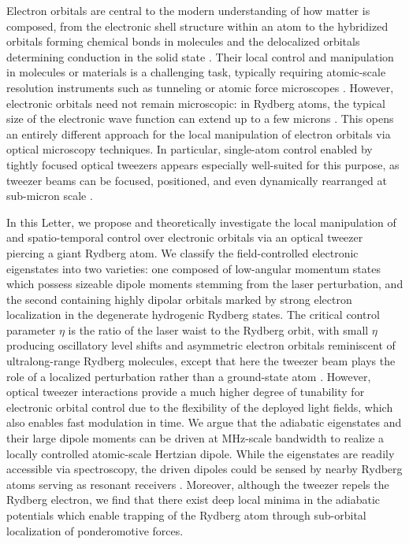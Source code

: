 \documentclass[aps,prl,groupedaddress,superscriptaddress,twocolumn,10pt,longbibliography]{revtex4-2}
\begin{document}
Electron orbitals are central to the modern understanding of how matter is composed, from the electronic shell structure within an atom to the hybridized orbitals forming chemical bonds in molecules and the delocalized orbitals determining conduction in the solid state  \cite{Schroedinger1926, Heitler1927, Bloch1929}. Their local control and manipulation in molecules or materials is a challenging task, typically requiring atomic-scale resolution instruments such as tunneling or atomic force microscopes \cite{Giessibl2003,Wang2024}. However, electronic orbitals need not remain microscopic: in Rydberg atoms, the typical size of the electronic wave function can extend up to a few microns \cite{Gallagher1994,Balewski2013,Kleinbach2018,Dunning2009}. This opens an entirely different approach for the local manipulation of electron orbitals via optical microscopy techniques.
In particular, single-atom control enabled by tightly focused optical tweezers appears especially well-suited for this purpose, as tweezer beams can be focused, positioned, and even dynamically rearranged at sub-micron scale \cite{Browaeys2020,Kaufman2021,Duta2000,Younge2010,Barredo2020,Holzl2024}.

In this Letter, we propose and theoretically investigate the local manipulation of and spatio-temporal control over electronic orbitals via an optical tweezer piercing a giant Rydberg atom.
We classify the field-controlled electronic eigenstates into two varieties: one composed of low-angular momentum states which possess sizeable dipole moments stemming from the laser perturbation, and the second containing highly dipolar orbitals marked by strong electron localization in the degenerate hydrogenic Rydberg states. The critical control parameter $\eta$ is the ratio of the laser waist to the Rydberg orbit, with small $\eta$ producing oscillatory level shifts and asymmetric electron orbitals reminiscent of ultralong-range Rydberg molecules, except that here the tweezer beam plays the role of a localized perturbation rather than a ground-state atom \cite{Greene2000,Shaffer2018,Eiles2019,Dunning2024}.
However, optical tweezer interactions provide a much higher degree of tunability for electronic orbital control due to the flexibility of the deployed light fields, which also enables fast modulation in time. We argue that the adiabatic eigenstates and their large dipole moments can be driven at MHz-scale bandwidth to realize a locally controlled atomic-scale Hertzian dipole. While the eigenstates are readily accessible via spectroscopy, the driven dipoles could be sensed by nearby Rydberg atoms serving as resonant receivers \cite{Adams2020}. Moreover, although the tweezer repels the Rydberg electron, we find that there exist deep local minima in the adiabatic potentials which enable trapping of the Rydberg atom through sub-orbital localization of ponderomotive forces.
\end{document}
